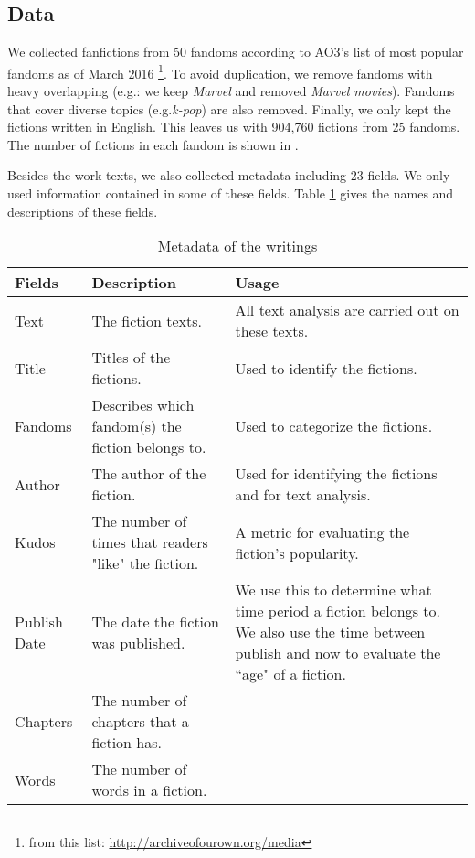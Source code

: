 \documentclass[a4paper]{article}
\begin{document}

\subsection{Data}
We collected fanfictions from 50 fandoms according to AO3's list of most popular fandoms as of March 2016 \footnote{from this list: \url{http://archiveofourown.org/media}}. To avoid duplication, we remove fandoms with heavy overlapping (e.g.: we keep \emph{Marvel} and removed \emph{Marvel movies}). Fandoms that cover diverse topics (e.g.\emph{k-pop}) are also removed. Finally, we only kept the fictions written in English. This leaves us with 904,760 fictions from 25 fandoms. The number of fictions in each fandom is shown in .



Besides the work texts, we also collected metadata including 23 fields. We only used information contained in some of these fields. Table \ref{tab:metadata} gives the names and descriptions of these fields. 

\begin{table}[htp]
\caption{Metadata of the writings}
\begin{center}
\begin{tabular}[width=0.8\textwidth]{p{2cm}|p{4cm}|p{5cm}}
  \hline			
 Fields & Description & Usage\\ 
   \hline			
Text & The fiction texts. & All text analysis are carried out on these texts.\\\hline
Title & Titles of the fictions. & Used to identify the fictions. \\\hline
Fandoms & Describes which fandom(s) the fiction belongs to. & Used to categorize the fictions.\\\hline
Author & The author of the fiction. & Used for identifying the fictions and for text analysis. \\\hline
Kudos & The number of times that readers "like" the fiction. &  A metric for evaluating the fiction's popularity.\\\hline
Publish Date & The date the fiction was published. & We use this to determine what time period a fiction belongs to. We also use the time between publish and now to evaluate the ``age" of a fiction.\\\hline
Chapters & The number of chapters that a fiction has. \\\hline
Words & The number of words in a fiction.\\\hline

\hline
\end{tabular}
\end{center}
\label{tab:metadata}
\end{table}%
\end{document}
